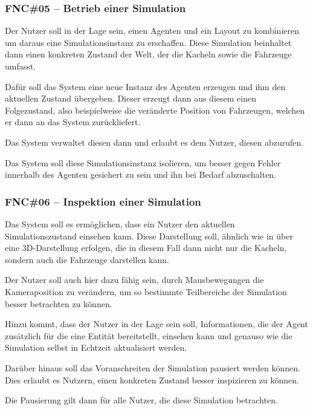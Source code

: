\subsubsection{FNC\#05 – Betrieb einer Simulation} \label{fnc:running_simulation}

Der Nutzer soll in der Lage sein, einen Agenten und ein Layout zu kombinieren um daraus eine Simulationsinstanz zu erschaffen.
Diese Simulation beinhaltet dann einen konkreten Zustand der Welt, der die Kacheln sowie die Fahrzeuge umfasst.

Dafür soll das System eine neue Instanz des Agenten erzeugen und ihm den aktuellen Zustand übergeben.
Dieser erzeugt dann aus diesem einen Folgezustand, also beispielweise die veränderte Position von Fahrzeugen, welchen er dann an das System zurückliefert.

Das System verwaltet diesen dann und erlaubt es dem Nutzer, diesen abzurufen.

Das System soll diese Simulationsinstanz isolieren, um besser gegen Fehler innerhalb des Agenten gesichert zu sein und ihn bei Bedarf abzuschalten.

\subsubsection{FNC\#06 – Inspektion einer Simulation} \label{fnc:inspecting_simulation}

Das System soll es ermöglichen, dass ein Nutzer den aktuellen Simulationszustand einsehen kann.
Diese Darstellung soll, ähnlich wie in  über eine 3D-Darstellung erfolgen, die in diesem Fall dann nicht nur die Kacheln, sondern auch die Fahrzeuge darstellen kann.

Der Nutzer soll auch hier dazu fähig sein, durch Mausbewegungen die Kameraposition zu verändern, um so bestimmte Teilbereiche der Simulation besser betrachten zu können.

Hinzu kommt, dass der Nutzer in der Lage sein soll, Informationen, die der Agent zusätzlich für die eine Entität bereitstellt, einsehen kann und genauso wie die Simulation selbst in Echtzeit aktualisiert werden.

Darüber hinaus soll das Voranschreiten der Simulation pausiert werden können.
Dies erlaubt es Nutzern, einen konkreten Zustand besser inspizieren zu können.

Die Pausierung gilt dann für alle Nutzer, die diese Simulation betrachten.
